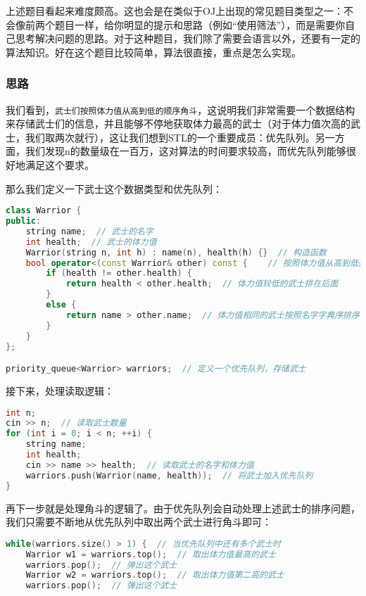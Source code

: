 \documentclass[../main.tex]{subfiles}
\begin{document}
\begin{answer}
  上述题目看起来难度颇高。这也会是在类似于OJ上出现的常见题目类型之一：不会像前两个题目一样，给你明显的提示和思路（例如“使用筛法”），而是需要你自己思考解决问题的思路。对于这种题目，我们除了需要会语言以外，还要有一定的算法知识。好在这个题目比较简单，算法很直接，重点是怎么实现。

  \subsubsection{思路}
  我们看到，\texttt{武士们按照体力值从高到低的顺序角斗}，这说明我们非常需要一个数据结构来存储武士们的信息，并且能够不停地获取体力最高的武士（对于体力值次高的武士，我们取两次就行），这让我们想到STL的一个重要成员：优先队列。另一方面，我们发现n的数量级在一百万，这对算法的时间要求较高，而优先队列能够很好地满足这个要求。

  那么我们定义一下武士这个数据类型和优先队列：
\begin{lstlisting}[language=C++]
class Warrior {
public:
    string name;  // 武士的名字
    int health;  // 武士的体力值
    Warrior(string n, int h) : name(n), health(h) {}  // 构造函数
    bool operator<(const Warrior& other) const {    // 按照体力值从高到低排序
        if (health != other.health) {
            return health < other.health;  // 体力值较低的武士排在后面
        }
        else {
            return name > other.name;  // 体力值相同的武士按照名字字典序排序
        }
    }
};

priority_queue<Warrior> warriors;  // 定义一个优先队列，存储武士
\end{lstlisting}

  接下来，处理读取逻辑：
\begin{lstlisting}[language=C++]
int n;
cin >> n;  // 读取武士数量
for (int i = 0; i < n; ++i) {
    string name;
    int health;
    cin >> name >> health;  // 读取武士的名字和体力值
    warriors.push(Warrior(name, health));  // 将武士加入优先队列
}
\end{lstlisting}

  再下一步就是处理角斗的逻辑了。由于优先队列会自动处理上述武士的排序问题，我们只需要不断地从优先队列中取出两个武士进行角斗即可：
\begin{lstlisting}[language=C++]
while(warriors.size() > 1) {  // 当优先队列中还有多个武士时
    Warrior w1 = warriors.top();  // 取出体力值最高的武士
    warriors.pop();  // 弹出这个武士
    Warrior w2 = warriors.top();  // 取出体力值第二高的武士
    warriors.pop();  // 弹出这个武士


\end{lstlisting}
\end{answer}
\end{document}
